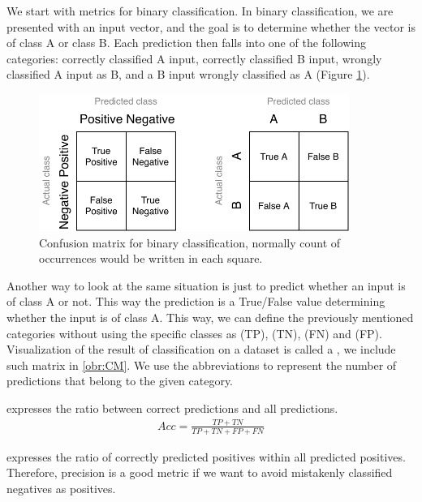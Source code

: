 We start with metrics for binary classification. In binary classification, we are presented with an input vector, and the goal is to determine whether the vector is of class A or class B. Each prediction then falls into one of the following categories: correctly classified A input, correctly classified B input, wrongly classified A input as B, and a B input wrongly classified as A (Figure \ref{obr:CM}). 

\begin{figure}[h]\centering
\includegraphics[width=0.9\textwidth]{./img//Diplomka diagramy-Confusion matric}
\caption{Confusion matrix for binary classification, normally count of occurrences would be written in each square. }
\label{obr:CM}
\end{figure}

Another way to look at the same situation is just to predict whether an input is of class A or not. This way the prediction is a True/False value determining whether the input is of class A. This way, we can define the previously mentioned categories without using the specific classes as  (TP),  (TN),  (FN) and  (FP). Visualization of the result of classification on a dataset is called a , we include such matrix in \autoref{obr:CM}. We use the abbreviations to represent the number of predictions that belong to the given category.  



 expresses the ratio between correct predictions and all predictions.
\begin{align}
Acc = \frac{TP+TN}{TP+TN+FP+FN}
\end{align} 



 expresses the ratio of correctly predicted positives within all predicted positives. Therefore, precision is a good metric if we want to avoid mistakenly classified negatives as positives.

